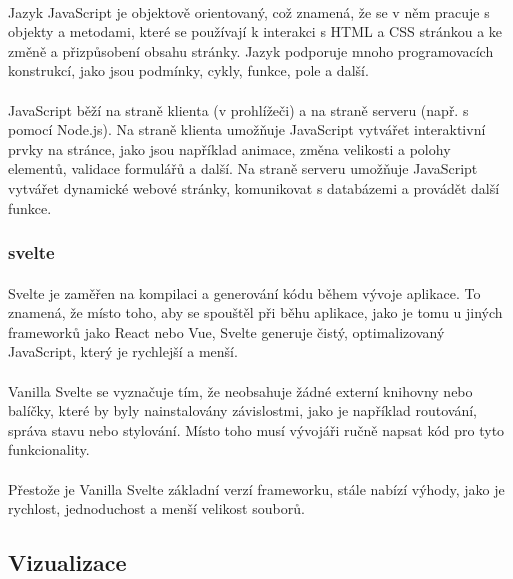 \documentclass[12pt]{article}
\begin{document}
\paragraph{}
Jazyk JavaScript je objektově orientovaný, což znamená, že se v něm pracuje s objekty a metodami, 
které se používají k interakci s HTML a CSS stránkou a ke změně a přizpůsobení obsahu stránky. 
Jazyk podporuje mnoho programovacích konstrukcí, jako jsou podmínky, cykly, funkce, pole a další.
\paragraph{}
JavaScript běží na straně klienta (v prohlížeči) a na straně serveru (např. s pomocí Node.js). Na 
straně klienta umožňuje JavaScript vytvářet interaktivní prvky na stránce, jako jsou například 
animace, změna velikosti a polohy elementů, validace formulářů a další. Na straně serveru umožňuje 
JavaScript vytvářet dynamické webové stránky, komunikovat s databázemi a provádět další funkce.

\subsubsection{svelte}
\paragraph{}
Svelte je zaměřen na kompilaci a generování kódu během vývoje aplikace. To znamená, že místo toho, 
aby se spouštěl při běhu aplikace, jako je tomu u jiných frameworků jako React nebo Vue, Svelte 
generuje čistý, optimalizovaný JavaScript, který je rychlejší a menší.
\paragraph{}
Vanilla Svelte se vyznačuje tím, že neobsahuje žádné externí knihovny nebo balíčky, které by 
byly nainstalovány závislostmi, jako je například routování, správa stavu nebo stylování. Místo 
toho musí vývojáři ručně napsat kód pro tyto funkcionality.
\paragraph{}
Přestože je Vanilla Svelte základní verzí frameworku, stále nabízí výhody, jako je rychlost, 
jednoduchost a menší velikost souborů.

\subsection{Vizualizace}
\end{document}
